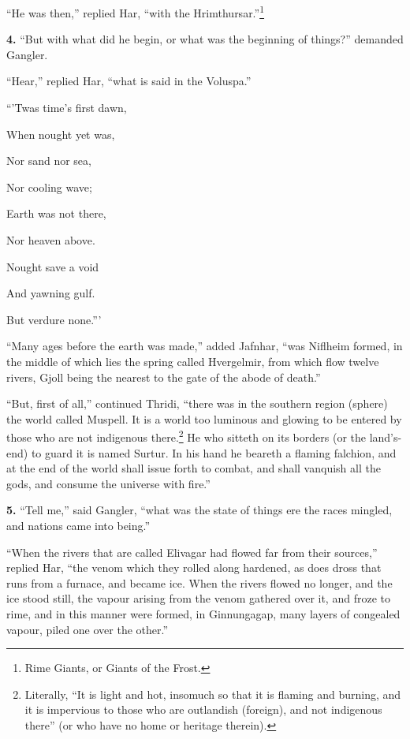 ``He was then,'' replied Har, ``with the Hrimthursar.''\footnote{Rime Giants, or Giants of the Frost.}


\textbf{4.} ``But with what did he begin, or what was the beginning of
things?'' demanded Gangler.

``Hear,'' replied Har, ``what is said in the Voluspa.''

``'Twas time's first dawn,

When nought yet was,

Nor sand nor sea,

Nor cooling wave;

Earth was not there,

Nor heaven above.

Nought save a void

And yawning gulf.

But verdure none.'''

``Many ages before the earth was made,'' added Jafnhar, ``was Niflheim
formed, in the middle of which lies the spring called Hvergelmir, from
which flow twelve rivers, Gjoll being the nearest to the gate of the
abode of death.''

``But, first of all,'' continued Thridi, ``there was in the southern
region (sphere) the world called Muspell. It is a world too luminous
and glowing to be entered by those who are not indigenous there.\footnote{Literally, ``It is light and hot, insomuch so that it is
flaming and burning, and it is impervious to those who are outlandish
(foreign), and not indigenous there'' (or who have no home or heritage
therein).}
He who sitteth on its borders (or the land's-end) to guard it is named
Surtur. In his hand he beareth a flaming falchion, and at the end of
the world shall issue forth to combat, and shall vanquish all the
gods, and consume the universe with fire.''


\textbf{5.} ``Tell me,'' said Gangler, ``what was the state of things ere the
races mingled, and nations came into being.''

``When the rivers that are called Elivagar had flowed far from their
sources,'' replied Har, ``the venom which they rolled along hardened, as
does dross that runs from a furnace, and became ice. When the rivers
flowed no longer, and the ice stood still, the vapour arising from the
venom gathered over it, and froze to rime, and in this manner were
formed, in Ginnungagap, many layers of congealed vapour, piled one
over the other.''


